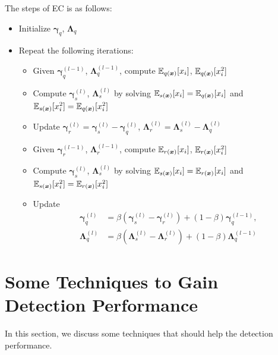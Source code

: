 \documentclass{article}
\begin{document}
The steps of EC is as follows:
\begin{itemize}
\item Initialize $\bm{\gamma}_q$, $\bm{\Lambda}_q$
\item Repeat the following iterations:
  \begin{itemize}
  \item Given $\bm{\gamma}_q^{(l-1)}$, $\bm{\Lambda}_q^{(l-1)}$, compute $\mathbb{E}_{q(\bm{x})}[x_i]$, $\mathbb{E}_{q(\bm{x})}[x_i^2]$
  \item Compute $\bm{\gamma}_s^{(l)}$, $\bm{\Lambda}_s^{(l)}$ by solving $\mathbb{E}_{s(\bm{x})}[x_i] = \mathbb{E}_{q(\bm{x})}[x_i]$ and $\mathbb{E}_{s(\bm{x})}[x_i^2] = \mathbb{E}_{q(\bm{x})}[x_i^2]$
  \item Update $\bm{\gamma}_r^{(l)} = \bm{\gamma}_s^{(l)} - \bm{\gamma}_q^{(l)}$, $\bm{\Lambda}_r^{(l)} = \bm{\Lambda}_s^{(l)} - \bm{\Lambda}_q^{(l)}$
  \item Given $\bm{\gamma}_r^{(l-1)}$, $\bm{\Lambda}_r^{(l-1)}$, compute $\mathbb{E}_{r(\bm{x})}[x_i]$, $\mathbb{E}_{r(\bm{x})}[x_i^2]$
  \item Compute $\bm{\gamma}_s^{(l)}$, $\bm{\Lambda}_s^{(l)}$ by solving $\mathbb{E}_{s(\bm{x})}[x_i] = \mathbb{E}_{r(\bm{x})}[x_i]$ and $\mathbb{E}_{s(\bm{x})}[x_i^2] = \mathbb{E}_{r(\bm{x})}[x_i^2]$
  \item Update
    \begin{align}
      \bm{\gamma}_q^{(l)} &= \beta \left( \bm{\gamma}_s^{(l)} - \bm{\gamma}_r^{(l)} \right) + (1 - \beta) \bm{\gamma}_q^{(l-1)}, \\
      \bm{\Lambda}_q^{(l)} &= \beta \left( \bm{\Lambda}_s^{(l)} - \bm{\Lambda}_r^{(l)} \right) + (1 - \beta) \bm{\Lambda}_q^{(l-1)}
    \end{align}
  \end{itemize}
\end{itemize}

\section{Some Techniques to Gain Detection Performance}
In this section, we discuss some techniques that should help the detection performance.
\end{document}
